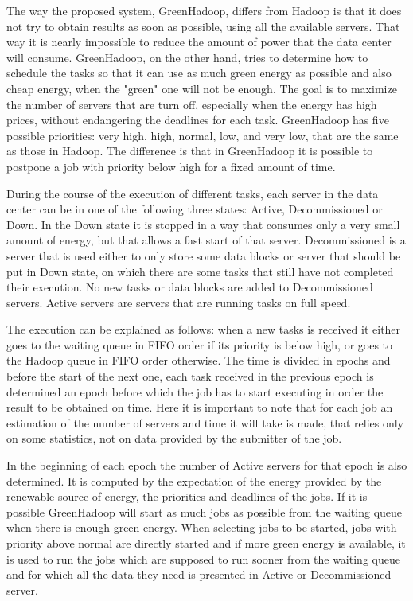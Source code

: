 \documentclass[9pt, a4paper]{article}
\theoremstyle{plain}
\begin{document}
  The way the proposed system, GreenHadoop, differs from Hadoop is that it does
  not try to obtain results as soon as possible, using all the available
  servers. That way it is nearly impossible to reduce the amount of power that
  the data center will consume. GreenHadoop, on the other hand, tries to
  determine how to schedule the tasks so that it can use as much green energy as
  possible and also cheap energy, when the "green" one will not be enough. The
  goal is to maximize the number of servers that are turn off, especially when
  the energy has high prices, without endangering the deadlines for each task.
  GreenHadoop has five possible priorities: very high, high, normal, low, and
  very low, that are the same as those in Hadoop. The difference is that in
  GreenHadoop it is possible to postpone a job with priority below high for a
  fixed amount of time.

  During the course of the execution of different tasks, each server in the data
  center can be in one of the following three states: Active, Decommissioned or
  Down. In the Down state it is stopped in a way that consumes only a very small
  amount of energy, but that allows a fast start of that server. Decommissioned
  is a server that is used either to only store some data blocks or server that
  should be put in Down state, on which there are some tasks that still have not
  completed their execution. No new tasks or data blocks are added to
  Decommissioned servers. Active servers are servers that are running tasks on
  full speed.

  The execution can be explained as follows: when a new tasks is received it
  either goes to the waiting queue in FIFO order if its priority is below high,
  or goes to the Hadoop queue in FIFO order otherwise. The time is divided in
  epochs and before the start of the next one, each task received in the
  previous epoch is determined an epoch before which the job has to start
  executing in order the result to be obtained on time. Here it is important to
  note that for each job an estimation of the number of servers and time it will
  take is made, that relies only on some statistics, not on data provided by the
  submitter of the job.

  In the beginning of each epoch the number of Active servers for that epoch is
  also determined. It is computed by the expectation of the energy provided by
  the renewable source of energy, the priorities and deadlines of the jobs. If
  it is possible GreenHadoop will start as much jobs as possible from the
  waiting queue when there is enough green energy. When selecting jobs to be
  started, jobs with priority above normal are directly started and if more
  green energy is available, it is used to run the jobs which are supposed to
  run sooner from the waiting queue and for which all the data they need is
  presented in Active or Decommissioned server. 
\end{document}
